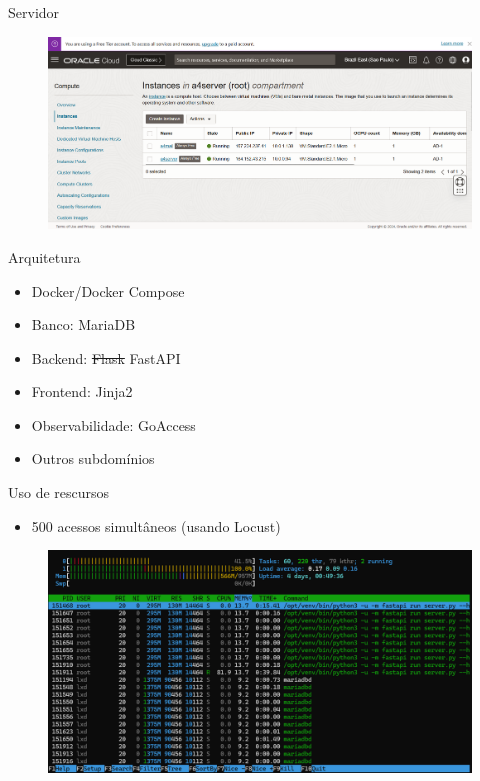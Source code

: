 \documentclass{beamer}
\begin{document}
\begin{frame}{Servidor}
    \begin{figure}[ht]
        \begin{center}
        \includegraphics[width=0.9\linewidth]{img/oracle.png}
        \label{fig:UI}
        \end{center}
    \end{figure}
\end{frame}

\begin{frame}{Arquitetura}
    \begin{itemize}
        \item Docker/Docker Compose
        \item Banco: MariaDB
        \item Backend: \st{Flask} FastAPI
        \item Frontend: Jinja2
        \item Observabilidade: GoAccess
        \item Outros subdomínios
    \end{itemize}
\end{frame}

\begin{frame}{Uso de rescursos}
    \begin{itemize}
        \item 500 acessos simultâneos (usando Locust)
    \end{itemize}
    
    \begin{figure}[ht]
        \begin{center}
        \includegraphics[width=0.8\linewidth]{img/server-500-acessos.png}
        \label{fig:arquitetura}
        \end{center}
    \end{figure}
\end{frame}
\end{document}
